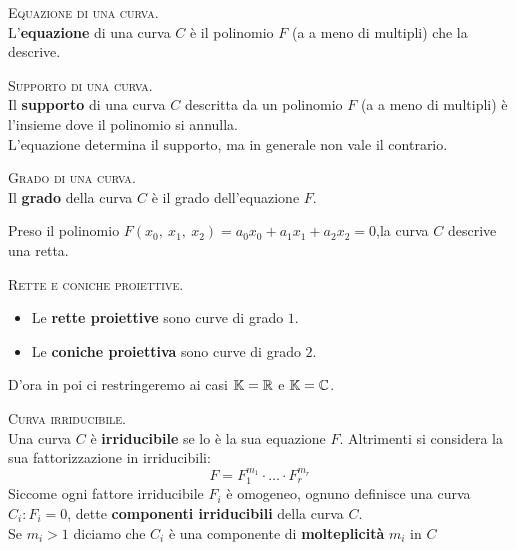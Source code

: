 \begin{define}\textsc{Equazione di una curva}.\\
	L'\textbf{equazione} di una curva $C$ è il polinomio $F$ (a a meno di multipli) che la descrive.
\end{define}
\begin{define}\textsc{Supporto di una curva}.\\
	Il \textbf{supporto} di una curva $C$ descritta da un polinomio $F$ (a a meno di multipli) è l'insieme dove il polinomio si annulla.\\
	L'equazione determina il supporto, ma in generale non vale il contrario.
\end{define}
\begin{define}\textsc{Grado di una curva}.\\
	Il \textbf{grado} della curva $C$ è il grado dell'equazione $F$.
\end{define}
\begin{example}
	Preso il polinomio $F(x_0,\ x_1,\ x_2)=a_0x_0+a_1x_1+a_2x_2=0$,la curva $C$ descrive una retta.
\end{example}
\begin{define}\textsc{Rette e coniche proiettive}.
	\begin{itemize}
		\item Le \textbf{rette proiettive} sono curve di grado $1$.
		\item Le \textbf{coniche proiettiva} sono curve di grado $2$.
	\end{itemize}
\vspace{-3mm}
\end{define}
D'ora in poi ci restringeremo ai casi $\mathbb{K}=\mathbb{R}$ e $\mathbb{K}=\mathbb{C}$.
\begin{define}\textsc{Curva irriducibile}.\\
Una curva $C$ è \textbf{irriducibile} se lo è la sua equazione $F$. Altrimenti si considera la sua fattorizzazione in irriducibili:
\begin{equation}
	F=F_1^{m_1}\cdot \ldots \cdot F_r^{m_r}
\end{equation}
Siccome ogni fattore irriducibile $F_i$ è omogeneo, ognuno definisce una curva $C_i\colon F_i=0$, dette \textbf{componenti irriducibili} della curva $C$.\\
Se $m_i>1$ diciamo che $C_i$ è una componente di \textbf{molteplicità} $m_i$ in $C$
\end{define}

